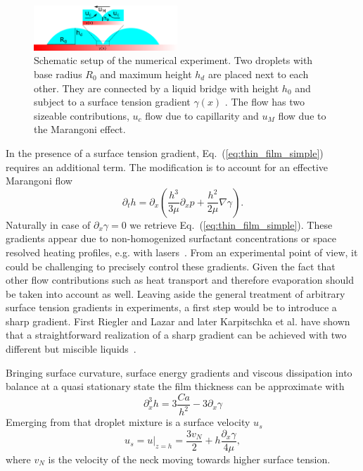 \documentclass[twocolumn,amsmath,amssymb,showpacs,pre,nofootinbib,superscriptaddress]{revtex4-1} %
\begin{document}
\begin{figure}
    \centering
    \includegraphics[width=0.48\textwidth]{Figures/setup.png}
    \caption{Schematic setup of the numerical experiment. 
    Two droplets with base radius $R_0$ and maximum height $h_d$ are placed next to each other. 
    They are connected by a liquid bridge with height $h_0$ and subject to a surface tension gradient $\gamma(x)$ .
    The flow has two sizeable contributions, $u_c$ flow due to capillarity and $u_M$ flow due to the Marangoni effect.
    }
    \label{fig:schematics}
\end{figure}
In the presence of a surface tension gradient, Eq.~(\ref{eq:thin_film_simple}) requires an additional term.
The modification is to account for an effective Marangoni flow~\cite{doi:10.1021/la500459v, karpitschka2014sharp, bestehorn20033d, doi:10.1021/la960488a}
\begin{equation}\label{eq:thin_with_marangoni}
    \partial_t h = \partial_x \left(\frac{h^3}{3\mu}\partial_x p + \frac{h^2}{2\mu}\nabla\gamma\right).
\end{equation}
Naturally in case of $\partial_x\gamma = 0$ we retrieve Eq.~(\ref{eq:thin_film_simple}).
These gradients appear due to non-homogenized surfactant concentrations or space resolved heating profiles, e.g. with lasers~\cite{doi:10.1021/la960488a, NIKOLOV2002325, bruning2018delayed, wedershoven2014infrared}.
From an experimental point of view, it could be challenging to precisely control these gradients.
Given the fact that other flow contributions such as heat transport and therefore evaporation should be taken into account as well.
Leaving aside the general treatment of arbitrary surface tension gradients in experiments, a first step would be to introduce a sharp gradient.
First Riegler and Lazar and later Karpitschka et al. have shown that a straightforward realization of a sharp gradient can be achieved with two different but miscible liquids~\cite{doi:10.1021/la800630w, karpitschka2014sharp, doi:10.1021/la500459v}. 

Bringing surface curvature, surface energy gradients and viscous dissipation into balance at a quasi stationary state the film thickness can be approximate with
\begin{equation}
    \partial_x^3 h = 3 \frac{Ca}{h^2} - 3\partial_x\gamma 
\end{equation}
Emerging from that droplet mixture is a surface velocity $u_s$~\cite{PhysRevLett.109.066103}
\begin{equation}\label{eq:Karpitschka_vel}
    u_s = u|_{z=h} = \frac{3v_N}{2} + h\frac{\partial_x\gamma}{4\mu},
\end{equation}
where $v_N$ is the velocity of the neck moving towards higher surface tension.
\end{document}
